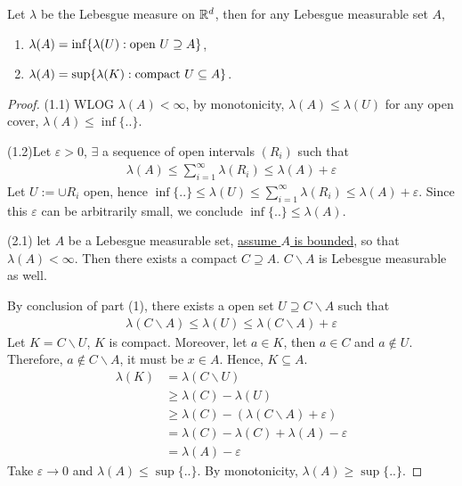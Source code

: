 \documentclass[11pt]{article}
\begin{document}
	\begin{theorem}
		Let $\lambda$ be the Lebesgue measure on $\mathbb{R}^d$, then for any Lebesgue measurable set $A$,
		\begin{enumerate}
			\item $\lambda(A) = \inf \{\lambda(U) : \text{{open }} U \supseteq A\}$,
			\item $\lambda(A) = \sup \{\lambda(K) : \text{{compact }} U \subseteq A\}$.
		\end{enumerate}
		\begin{proof}
			(1.1) WLOG $\lambda(A) < \infty$, by monotonicity, $\lambda(A) \leq \lambda(U)$ for any open cover, $\lambda(A) \leq \inf \{..\}$.
			
			(1.2)Let $\varepsilon > 0$, $\exists$ a sequence of open intervals $(R_i)$ such that 
			\begin{align}
				\lambda(A) \leq \sum^\infty_{i=1} \lambda(R_i) \leq \lambda(A) + \varepsilon
			\end{align}
			Let $U := \cup R_i$ open, hence $\inf \{..\} \leq \lambda(U) \leq \sum^\infty_{i=1} \lambda(R_i) \leq \lambda(A) + \varepsilon$. Since this $\varepsilon$ can be arbitrarily small, we conclude $\inf\{..\} \leq \lambda(A)$.
			
			(2.1) let $A$ be a Lebesgue measurable set, \ul{assume $A$ is bounded}, so that $\lambda(A) < \infty$. Then there exists a compact $C \supseteq A$. $C \backslash A$ is Lebesgue measurable as well.
			
			By conclusion of part (1), there exists a open set $U \supseteq C \backslash A$ such that 
			\begin{align}
				\lambda(C \backslash A) \leq \lambda(U) \leq \lambda(C \backslash A) + \varepsilon
			\end{align}
			Let $K = C \backslash U$, $K$ is compact. Moreover, let $a \in K$, then $a \in C$ and $a \notin U$. Therefore, $a \notin C \backslash A$, it must be $x \in A$. Hence, $K \subseteq A$.
			\begin{align}
				\lambda(K) &= \lambda(C \backslash U) \\
				&\geq \lambda(C) - \lambda(U) \\
				&\geq \lambda(C) - (\lambda(C \backslash A) + \varepsilon) \\
				&=\lambda(C) - \lambda(C) + \lambda(A) - \varepsilon \\
				&=\lambda(A) - \varepsilon
			\end{align}
			Take $\varepsilon \to 0$ and $\lambda(A) \leq \sup \{..\}$. By monotonicity, $\lambda(A) \geq \sup \{..\}$.
			

\end{proof}
\end{theorem}
\end{document}
